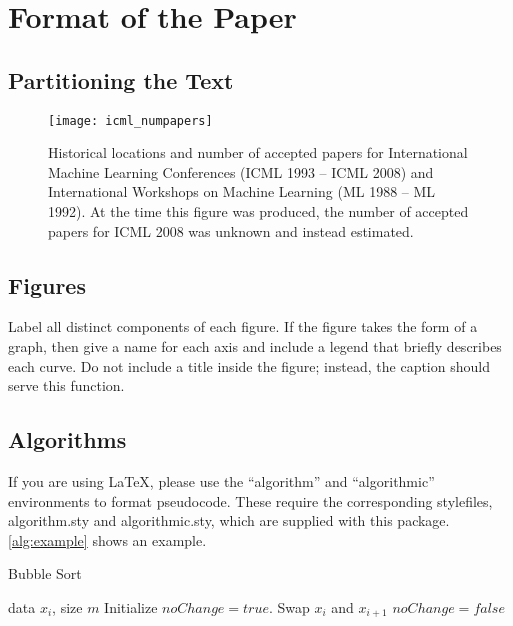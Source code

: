 \documentclass{article}
\theoremstyle{plain}
\theoremstyle{definition}
\theoremstyle{remark}
\begin{document}
\section{Format of the Paper}

\subsection{Partitioning the Text}

\begin{figure}[ht]
\vskip 0.2in
\begin{center}
\centerline{\texttt{[image: icml\_numpapers]}}
\caption{Historical locations and number of accepted papers for International
Machine Learning Conferences (ICML 1993 -- ICML 2008) and International
Workshops on Machine Learning (ML 1988 -- ML 1992). At the time this figure was
produced, the number of accepted papers for ICML 2008 was unknown and instead
estimated.}
\label{icml-historical}
\end{center}
\vskip -0.2in
\end{figure}

\subsection{Figures}

Label all distinct components of each figure. If the figure takes the
form of a graph, then give a name for each axis and include a legend
that briefly describes each curve. Do not include a title inside the
figure; instead, the caption should serve this function.

\subsection{Algorithms}

If you are using \LaTeX, please use the ``algorithm'' and ``algorithmic''
environments to format pseudocode. These require
the corresponding stylefiles, algorithm.sty and
algorithmic.sty, which are supplied with this package.
\cref{alg:example} shows an example.

\begin{algorithm}[tb]
   \caption{Bubble Sort}
   \label{alg:example}
\begin{algorithmic}
    data $x_i$, size $m$
   \REPEAT
   \STATE Initialize $noChange = true$.
   \STATE Swap $x_i$ and $x_{i+1}$
   \STATE $noChange = false$
   \ENDIF
   \ENDFOR
\end{algorithmic}
\end{algorithm}
\end{document}
